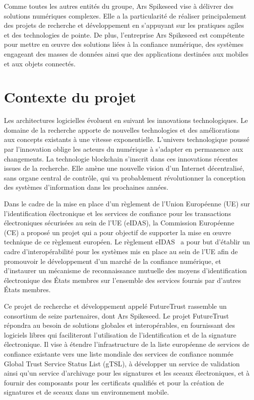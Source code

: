 \documentclass{tnreport}
\begin{document}
Comme toutes les autres entités du groupe, Ar{\texteta}s Spikeseed vise à délivrer des solutions numériques complexes. Elle a la particularité de réaliser principalement des projets de recherche et développement en s'appuyant sur les pratiques agiles et des technologies de pointe. 
De plus, l'entreprise Ar{\texteta}s Spikeseed est compétente pour mettre en œuvre 
des solutions liées à la confiance numérique, 
des systèmes engageant des masses de données ainsi que 
des applications destinées aux mobiles et aux objets connectés.

\section{Contexte du projet}

Les architectures logicielles évoluent en suivant les innovations technologiques. Le domaine de la recherche apporte de nouvelles technologies et des améliorations aux concepts existants à une vitesse exponentielle. L'univers technologique poussé par l'innovation oblige les acteurs du numérique à s'adapter en permanence aux changements. La technologie blockchain s'inscrit dans ces innovations récentes issues de la recherche. Elle amène une nouvelle vision d'un Internet décentralisé, sans organe central de contrôle, qui va probablement révolutionner la conception des systèmes d'information dans les prochaines années.

Dans le cadre de la mise en place d'un règlement de l'Union Européenne (UE) sur l'identification électronique et les services de confiance pour les transactions électroniques sécurisées au sein de l'UE (eIDAS), la Commission Européenne (CE) a proposé un projet qui a pour objectif de supporter la mise en œuvre technique de ce règlement européen. 
Le règlement eIDAS~\cite{eIDAS} a pour but d'établir un cadre d’interopérabilité pour les systèmes mis en place au sein de l'UE afin de promouvoir le développement d’un marché de la confiance numérique, et d'instaurer un mécanisme de reconnaissance mutuelle des moyens d’identification électronique des États membres sur l’ensemble des services fournis par d'autres États membres.

Ce projet de recherche et développement appelé FutureTrust rassemble un consortium de seize partenaires, dont Ar{\texteta}s Spikeseed. 
Le projet FutureTrust répondra au besoin de solutions globales et interopérables, en fournissant des logiciels libres qui faciliteront l'utilisation de l'identification et de la signature électronique. 
Il vise à étendre l'infrastructure de la liste européenne de services de confiance existante vers une liste mondiale des services de confiance nommée Global Trust Service Status List (gTSL), à développer un service de validation ainsi qu'un service d'archivage pour les signatures et les sceaux électroniques, et à fournir des composants pour les certificats qualifiés et pour la création de signatures et de sceaux dans un environnement mobile.
\end{document}
